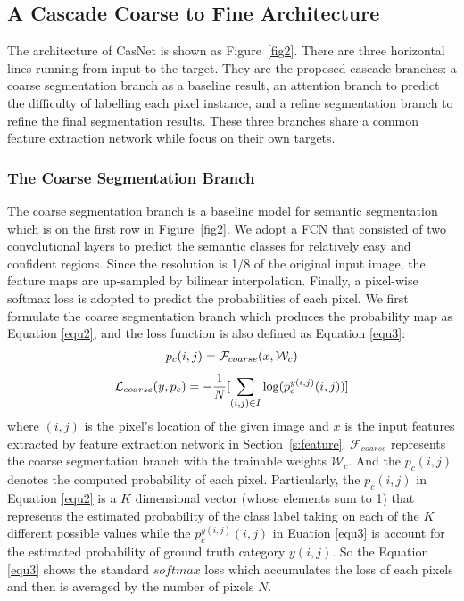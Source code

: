\documentclass[10.5pt,compsoc]{TsT}
\theoremstyle{mystyle}
\begin{document}
{\subsection{A Cascade Coarse to Fine Architecture}
\label{s:casnet}
\noindent

The architecture of CasNet is shown as Figure~\ref{fig2}. There are three horizontal lines running from input to the target. They are the proposed cascade branches: a coarse segmentation branch as a baseline result, an attention branch to predict the difficulty of labelling each pixel instance, and a refine segmentation branch to refine the final segmentation results. 
These three branches share a common feature extraction network while focus on their own targets.

\subsubsection{The Coarse Segmentation Branch}
\label{s:cbb}
\noindent

The coarse segmentation branch is a baseline model for semantic segmentation which is on the first row in Figure~\ref{fig2}. We adopt a FCN that consisted of two convolutional layers to predict the semantic classes for relatively easy and confident regions. Since the resolution is 1/8 of the original input image, the feature maps are up-sampled by bilinear interpolation. Finally, a pixel-wise softmax loss is adopted to predict the probabilities of each pixel. We first formulate the coarse segmentation branch which produces the probability map as Equation \ref{equ2}, and the loss function is also defined as Equation \ref{equ3}: 
\begin{equation}\label{equ2}
\setlength\abovedisplayskip{8pt}
\setlength\belowdisplayskip{8pt}
\begin{split}
p_{c}(i,j) &= \mathcal{F}_{coarse}(x, \mathcal{W}_c)\\
\end{split}
\end{equation} 
\begin{equation}\label{equ3}
\setlength\abovedisplayskip{8pt}
\setlength\belowdisplayskip{8pt}
\begin{split}
\mathcal{L}_{coarse}(y, p_c) &= - \frac{1}{N}[\sum_{(i,j)\in I}\log(p^{y(i,j)}_c(i,j))]\\
\end{split}
\end{equation} 
where $(i,j)$ is the pixel's location of the given image and $x$ is the input features extracted by feature extraction network in Section~\ref{s:feature}. $ \mathcal{F}_{coarse}$ represents the coarse segmentation branch with the trainable weights $ \mathcal{W}_c$. And the $p_{c}(i,j)$ denotes the computed probability of each pixel. Particularly, the $p_{c}(i,j)$ in Equation \ref{equ2} is a $K$ dimensional vector (whose elements sum to 1) that represents the estimated probability of the class label taking on each of the $K$ different possible values while the $p^{y(i,j)}_c(i,j)$ in Euation \ref{equ3} is account for the estimated probability of ground truth category $y(i,j)$. So the  Equation \ref{equ3} shows the standard $softmax$ loss which accumulates the loss of each pixels and then is averaged by the number of pixels $N$. 

}
\end{document}
